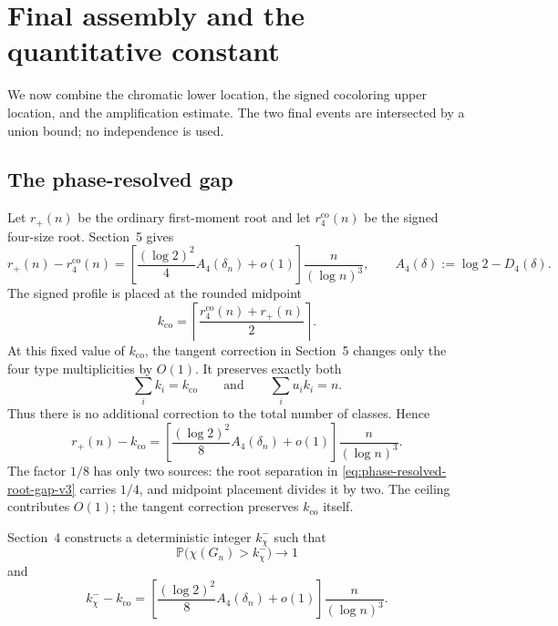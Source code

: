 \section{Final assembly and the quantitative constant}
\label{sec:final-assembly-v3}

We now combine the chromatic lower location, the signed cocoloring upper
location, and the amplification estimate. The two final events are intersected
by a union bound; no independence is used.

\subsection{The phase-resolved gap}

Let $r_+(n)$ be the ordinary first-moment root and let
$r_4^{\mathrm{co}}(n)$ be the signed four-size root. Section~5 gives
\begin{equation}
  r_+(n)-r_4^{\mathrm{co}}(n)
  =
  \left[
    \frac{(\log 2)^2}{4}A_4(\delta_n)+o(1)
  \right]
  \frac{n}{(\log n)^3},
  \qquad
  A_4(\delta):=\log 2-D_4(\delta).
  \label{eq:phase-resolved-root-gap-v3}
\end{equation}
The signed profile is placed at the rounded midpoint
\[
  k_{\mathrm{co}}
  =
  \left\lceil
    \frac{r_4^{\mathrm{co}}(n)+r_+(n)}2
  \right\rceil.
\]
At this fixed value of $k_{\mathrm{co}}$, the tangent correction in Section~5
changes only the four type multiplicities by $O(1)$. It preserves exactly both
\[
  \sum_i k_i=k_{\mathrm{co}}
  \qquad\text{and}\qquad
  \sum_i u_i k_i=n.
\]
Thus there is no additional correction to the total number of classes. Hence
\begin{equation}
  r_+(n)-k_{\mathrm{co}}
  =
  \left[
    \frac{(\log 2)^2}{8}A_4(\delta_n)+o(1)
  \right]
  \frac{n}{(\log n)^3}.
  \label{eq:midpoint-retained-gap-v3}
\end{equation}
The factor $1/8$ has only two sources: the root separation in
\eqref{eq:phase-resolved-root-gap-v3} carries $1/4$, and midpoint placement
divides it by two. The ceiling contributes $O(1)$; the tangent correction
preserves $k_{\mathrm{co}}$ itself.

Section~4 constructs a deterministic integer $k_\chi^-$ such that
\[
  \mathbb P\bigl(\chi(G_n)>k_\chi^-\bigr)\longrightarrow1
\]
and
\begin{equation}
  k_\chi^- - k_{\mathrm{co}}
  =
  \left[
    \frac{(\log 2)^2}{8}A_4(\delta_n)+o(1)
  \right]
  \frac{n}{(\log n)^3}.
  \label{eq:integer-location-gap-v3}
\end{equation}

